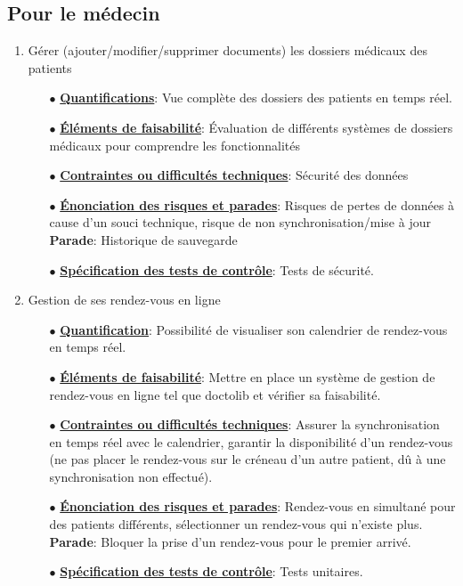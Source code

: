 \documentclass[a4paper]{book}
\begin{document}
\subsection{Pour le médecin}

\begin{enumerate}
    \item Gérer (ajouter/modifier/supprimer documents) les dossiers médicaux des patients \newline
    \begin{itemize}
        \item[$\bullet$] \textbf{\underline{Quantifications}}: Vue complète des dossiers des patients en temps réel.

        \item[$\bullet$] \textbf{\underline{Éléments de faisabilité}}: Évaluation de différents systèmes de dossiers médicaux pour comprendre les fonctionnalités
        \item[$\bullet$] \textbf{\underline{Contraintes ou difficultés techniques}}: Sécurité des données 
        \item[$\bullet$] \textbf{\underline{Énonciation des risques et parades}}: Risques de pertes de données à cause d’un souci technique, risque de non synchronisation/mise à jour
        \textbf{Parade}: Historique de sauvegarde
        \item[$\bullet$] \textbf{\underline{Spécification des tests de contrôle}}: Tests de sécurité.\newline
    \end{itemize}

    \item Gestion de ses rendez-vous en ligne\newline
    \begin{itemize}
        \item[$\bullet$] \textbf{\underline{Quantification}}: Possibilité de visualiser son calendrier de rendez-vous en temps réel.
        \item[$\bullet$] \textbf{\underline{Éléments de faisabilité}}: Mettre en place un système de gestion de rendez-vous en ligne tel que doctolib et vérifier sa faisabilité.
        \item[$\bullet$] \textbf{\underline{Contraintes ou difficultés techniques}}: Assurer la synchronisation en temps réel avec le calendrier, garantir la disponibilité d’un rendez-vous 
        (ne pas placer le rendez-vous sur le créneau d’un autre patient, dû à une synchronisation non effectué).
        \item[$\bullet$] \textbf{\underline{Énonciation des risques et parades}}: Rendez-vous en simultané pour des patients différents, sélectionner un rendez-vous qui n'existe plus.\newline
        \textbf{Parade}:  Bloquer la prise d’un rendez-vous pour le premier arrivé.
        \item[$\bullet$] \textbf{\underline{Spécification des tests de contrôle}}: Tests unitaires. \newline
    \end{itemize}


\end{enumerate}
\end{document}
